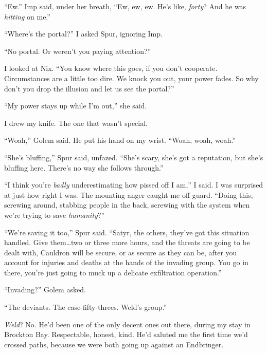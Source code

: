 ``Ew.''  Imp said, under her breath, ``Ew, ew, ew.  He's like, \emph{forty}?  And he was \emph{hitting} on me.''



``Where's the portal?'' I asked Spur, ignoring Imp.



``No portal.  Or weren't you paying attention?''



I looked at Nix.  ``You know where this goes, if you don't cooperate.  Circumstances are a little too dire.  We knock you out, your power fades.  So why don't you drop the illusion and let us see the portal?''



``My power stays up while I'm out,'' she said.



I drew my knife.  The one that wasn't special.



``Woah,'' Golem said.  He put his hand on my wrist.  ``Woah, woah, woah.''



``She's bluffing,'' Spur said, unfazed.  ``She's scary, she's got a reputation, but she's bluffing here.  There's no way she follows through.''



``I think you're \emph{badly }underestimating how pissed off I am,'' I said.  I was surprised at just how right I was.  The mounting anger caught me off guard.  ``Doing this, screwing around, stabbing people in the back, screwing with the system when we're trying to save \emph{humanity}?''



``We're saving it too,'' Spur said.  ``Satyr, the others, they've got this situation handled.  Give them\ldots two or three more hours, and the threats are going to be dealt with, Cauldron will be secure, or as secure as they can be, after you account for injuries and deaths at the hands of the invading group.  You go in there, you're just going to muck up a delicate exfiltration operation.''



``Invading?'' Golem asked.



``The deviants.  The case-fifty-threes.  Weld's group.''



\emph{Weld}?  No.  He'd been one of the only decent ones out there, during my stay in Brockton Bay.  Respectable, honest, kind.  He'd saluted me the first time we'd crossed paths, because we were both going up against an Endbringer.



